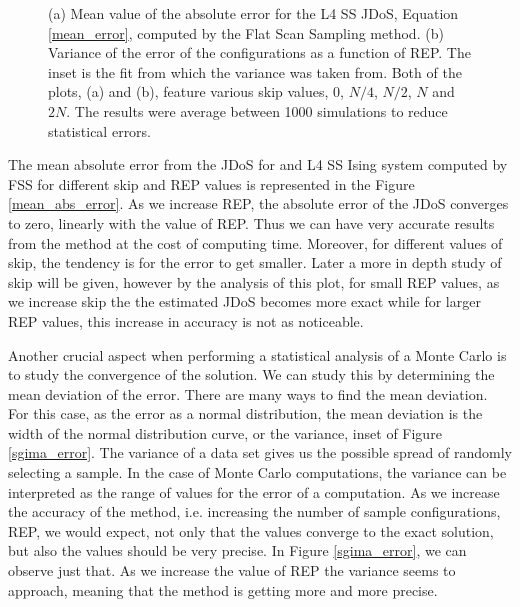 \begin{figure}[h]
	\centering
	\caption{(a) Mean value of the absolute error for the L4 SS JDoS, Equation \ref{mean_error}, computed by the Flat Scan Sampling method. (b) Variance of the error of the configurations as a function of REP. The inset is the fit from which the variance was taken from. Both of the plots, (a) and (b), feature various skip values, $0$, $N/4$, $N/2$, $N$ and $2N$. The results were average between 1000 simulations to reduce statistical errors.}
\end{figure}

	The mean absolute error from the JDoS for and L4 SS Ising system computed by FSS for different skip and REP values is represented in the Figure \ref{mean_abs_error}. As we increase REP, the absolute error of the JDoS converges to zero, linearly with the value of REP. Thus we can have very accurate results from the method at the cost of computing time. 
Moreover, for different values of skip, the tendency is for the error to get smaller. Later a more in depth study of skip will be given, however by the analysis of this plot, for small REP values, as we increase skip the the estimated JDoS becomes more exact while for larger REP values, this increase in accuracy is not as noticeable.

	Another crucial aspect when performing a statistical analysis of a Monte Carlo is to study the convergence of the solution. We can study this by determining the mean deviation of the error. There are many ways to find the mean deviation. For this case, as the error as a normal distribution, the mean deviation is the width of the normal distribution curve, or the variance, inset of Figure \ref{sgima_error}. The variance of a data set gives us the possible spread of randomly selecting a sample. 
In the case of Monte Carlo computations, the variance can be interpreted as the range of values for the error of a computation. As we increase the accuracy of the method, i.e. increasing the number of sample configurations, REP, we would expect, not only that the values converge to the exact solution, but also the values should be very precise. 
In Figure \ref{sgima_error}, we can observe just that. As we increase the value of REP the variance seems to approach, meaning that the method is getting more and more precise. 
	
